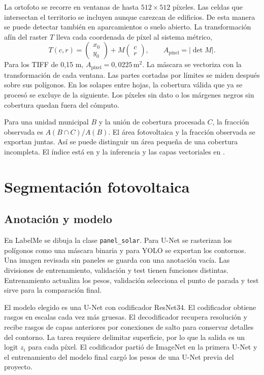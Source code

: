 \documentclass[11pt,a4paper]{article}
\begin{document}
La ortofoto se recorre en ventanas de hasta \(512\times512\) píxeles. Las celdas que intersectan el territorio se incluyen aunque carezcan de edificios. De esta manera se puede detectar también en aparcamientos o suelo abierto. La transformación afín del raster \(T\) lleva cada coordenada de píxel al sistema métrico,
\[
T(c,r)=
\begin{pmatrix}x_0\\y_0\end{pmatrix}
+M\begin{pmatrix}c\\r\end{pmatrix},
\qquad
A_{\text{píxel}}=|\det M|.
\]
Para los TIFF de 0,15 m, \(A_{\text{píxel}}=0{,}0225\,\mathrm{m}^2\). La máscara se vectoriza con la transformación de cada ventana. Las partes cortadas por límites se miden después sobre sus polígonos. En los solapes entre hojas, la cobertura válida que ya se procesó se excluye de la siguiente. Los píxeles sin dato o los márgenes negros sin cobertura quedan fuera del cómputo.

Para una unidad municipal \(B\) y la unión de cobertura procesada \(C\), la fracción observada es \(A(B\cap C)/A(B)\). El área fotovoltaica y la fracción observada se exportan juntas. Así se puede distinguir un área pequeña de una cobertura incompleta. El índice está en  y la inferencia y las capas vectoriales en .

\section{Segmentación fotovoltaica}

\subsection{Anotación y modelo}

En LabelMe se dibuja la clase \texttt{panel\_solar}. Para U-Net se rasterizan los polígonos como una máscara binaria y para YOLO se exportan los contornos. Una imagen revisada sin paneles se guarda con una anotación vacía. Las divisiones de entrenamiento, validación y test tienen funciones distintas. Entrenamiento actualiza los pesos, validación selecciona el punto de parada y test sirve para la comparación final.

El modelo elegido es una U-Net con codificador ResNet34. El codificador obtiene rasgos en escalas cada vez más gruesas. El decodificador recupera resolución y recibe rasgos de capas anteriores por conexiones de salto para conservar detalles del contorno. La tarea requiere delimitar superficie, por lo que la salida es un logit \(z_i\) para cada píxel. El codificador partió de ImageNet en la primera U-Net y el entrenamiento del modelo final cargó los pesos de una U-Net previa del proyecto. \cite{unet,resnet}
\end{document}
